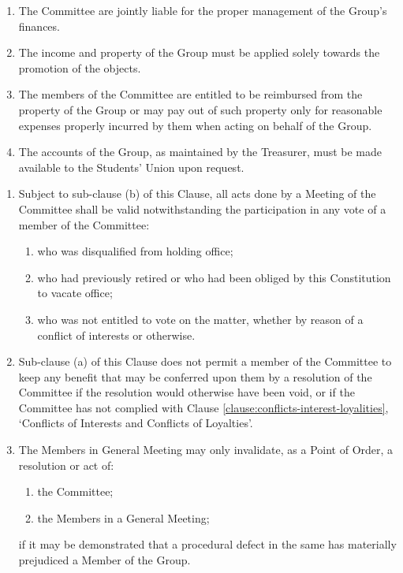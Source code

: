 \documentclass[12pt]{constitution}
\begin{document}
\label{clause:financial-management}

\begin{enumerate}
    \item The Committee are jointly liable for the proper management of the Group's finances.
    \item The income and property of the Group must be applied solely towards the promotion of the objects.
    \item The members of the Committee are entitled to be reimbursed from the property of the Group or may pay out of such property only for reasonable expenses properly incurred by them when acting on behalf of the Group.
    \item The accounts of the Group, as maintained by the Treasurer, must be made available to the Students' Union upon request.
\end{enumerate}


\label{clause:irregularities-saving-provisions}

\begin{enumerate}
    \item Subject to sub-clause (b) of this Clause, all acts done by a Meeting of the Committee shall be valid notwithstanding the participation in any vote of a member of the Committee:
    \begin{enumerate}
        \item who was disqualified from holding office;
        \item who had previously retired or who had been obliged by this Constitution to vacate office;
        \item who was not entitled to vote on the matter, whether by reason of a conflict of interests or otherwise.
    \end{enumerate}

    \item Sub-clause (a) of this Clause does not permit a member of the Committee to keep any benefit that may be conferred upon them by a resolution of the Committee if the resolution would otherwise have been void, or if the Committee has not complied with Clause \ref{clause:conflicts-interest-loyalities}, `Conflicts of Interests and Conflicts of Loyalties'.
    \item The Members in General Meeting may only invalidate, as a Point of Order, a resolution or act of:
    \begin{enumerate}
        \item the Committee;
        \item the Members in a General Meeting;
    \end{enumerate}
    if it may be demonstrated that a procedural defect in the same has materially prejudiced a Member of the Group.
\end{enumerate}
\end{document}
